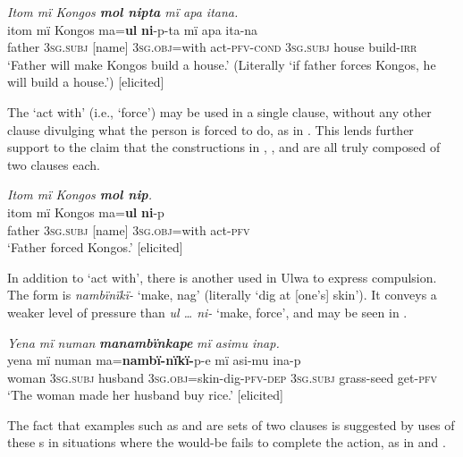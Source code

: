 \ea%
    \label{ex:syntax:351}
          \textit{Itom mï Kongos \textbf{mol nipta} mï apa itana.}\\
\gll itom  mï      Kongos  ma=\textbf{ul}      \textbf{ni}{}-p-ta      mï apa    ita-na\\
    father  3\textsc{sg.subj}  [name]    3\textsc{sg.obj}=with  act-\textsc{pfv}{}-\textsc{cond}  \textsc{3sg.subj}    house  build-\textsc{irr}\\
\glt `Father will make Kongos build a house.’ (Literally ‘if father forces Kongos, he will build a house.’) [elicited]
\z

  The  ‘act with’ (i.e., ‘force’) may be used in a single clause, without any other clause divulging what the person is forced to do, as in . This lends further support to the claim that the  constructions in , , and  are all truly composed of two clauses each.

\ea%
    \label{ex:syntax:352}
          \textit{Itom mï Kongos \textbf{mol nip}.}\\
\gll itom  mï      Kongos  ma=\textbf{ul}      \textbf{ni}{}-p\\
    father  3\textsc{sg.subj}  [name]    3\textsc{sg.obj}=with  act-\textsc{pfv}\\
\glt `Father forced Kongos.’ [elicited]
\z

In addition to ‘act with’, there is another  used in Ulwa to express compulsion. The form is \textit{nambïnïkï-} ‘make, nag’ (literally ‘dig at [one’s] skin’). It conveys a weaker level of pressure than \textit{ul … ni-} ‘make, force’, and may be seen in .

\ea%
    \label{ex:syntax:353}
          \textit{Yena mï numan} \textbf{\textit{manambïnkape}} \textit{mï asimu inap.}\\
\gll    yena  mï      numan    ma=\textbf{nambï-nïkï-}p-e mï      asi-mu    ina-p\\
    woman  3\textsc{sg.subj}  husband  3\textsc{sg.obj}=skin-dig-\textsc{pfv-dep}    3\textsc{sg.subj}  grass-seed  get-\textsc{pfv}\\
\glt `The woman made her husband buy rice.’ [elicited]
\z

The fact that examples such as  and  are sets of two clauses is suggested by uses of these  s in situations where the would-be  fails to complete the action, as in  and .

